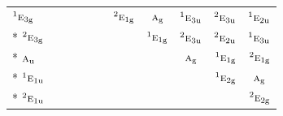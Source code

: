 \documentclass[10pt,a4paper]{article}
\numberwithin{equation}{section}
\newcommand{\irr}[1]{\text{\normalfont\scshape #1}}
\newcommand{\conjpair}[1]{{}^{#1}}
\newcommand{\ptag}[1]{\mathrm{#1}}
\begin{document}
{\begin{longtable}{@{}lcccccccccc@{}}
$\conjpair{1}\irr{e}_{3\ptag{g}}$ &  &  &  &  &  & $\conjpair{2}\irr{e}_{1\ptag{g}}$ & $\irr{a}_{\ptag{g}}$ & $\conjpair{1}\irr{e}_{3\ptag{u}}$ & $\conjpair{2}\irr{e}_{3\ptag{u}}$ & $\conjpair{1}\irr{e}_{2\ptag{u}}$\\*
$\conjpair{2}\irr{e}_{3\ptag{g}}$ &  &  &  &  &  &  & $\conjpair{1}\irr{e}_{1\ptag{g}}$ & $\conjpair{2}\irr{e}_{3\ptag{u}}$ & $\conjpair{2}\irr{e}_{2\ptag{u}}$ & $\conjpair{1}\irr{e}_{3\ptag{u}}$\\*
$\irr{a}_{\ptag{u}}$ &  &  &  &  &  &  &  & $\irr{a}_{\ptag{g}}$ & $\conjpair{1}\irr{e}_{1\ptag{g}}$ & $\conjpair{2}\irr{e}_{1\ptag{g}}$\\*
$\conjpair{1}\irr{e}_{1\ptag{u}}$ &  &  &  &  &  &  &  &  & $\conjpair{1}\irr{e}_{2\ptag{g}}$ & $\irr{a}_{\ptag{g}}$\\*
$\conjpair{2}\irr{e}_{1\ptag{u}}$ &  &  &  &  &  &  &  &  &  & $\conjpair{2}\irr{e}_{2\ptag{g}}$\\
\bottomrule\end{longtable}}
\end{document}

